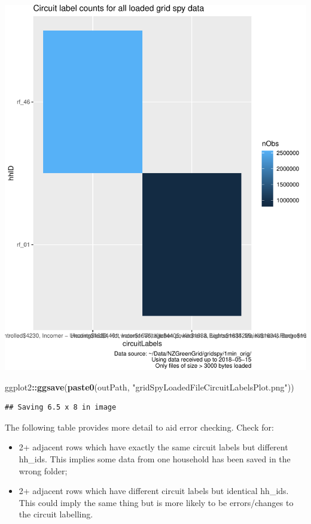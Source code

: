 \documentclass[]{article}
\newenvironment{Shaded}{\begin{snugshade}}{\end{snugshade}}
\newcommand{\KeywordTok}[1]{\textcolor[rgb]{0.13,0.29,0.53}{\textbf{#1}}}
\newcommand{\StringTok}[1]{\textcolor[rgb]{0.31,0.60,0.02}{#1}}
\newcommand{\OperatorTok}[1]{\textcolor[rgb]{0.81,0.36,0.00}{\textbf{#1}}}
\newcommand{\NormalTok}[1]{#1}
\providecommand{\tightlist}{%
  \setlength{\itemsep}{0pt}\setlength{\parskip}{0pt}}
\begin{document}
\includegraphics{processNZGGElecCons1minData_v2_files/figure-latex/plotCircuitLabelIssuesAsTile-1.pdf}

\begin{Shaded}
\begin{Highlighting}[]
\NormalTok{ggplot2}\OperatorTok{::}\KeywordTok{ggsave}\NormalTok{(}\KeywordTok{paste0}\NormalTok{(outPath, }\StringTok{"gridSpyLoadedFileCircuitLabelsPlot.png"}\NormalTok{))}
\end{Highlighting}
\end{Shaded}

\begin{verbatim}
## Saving 6.5 x 8 in image
\end{verbatim}

The following table provides more detail to aid error checking. Check
for:

\begin{itemize}
\tightlist
\item
  2+ adjacent rows which have exactly the same circuit labels but
  different hh\_ids. This implies some data from one household has been
  saved in the wrong folder;
\item
  2+ adjacent rows which have different circuit labels but identical
  hh\_ids. This could imply the same thing but is more likely to be
  errors/changes to the circuit labelling.
\end{itemize}
\end{document}
